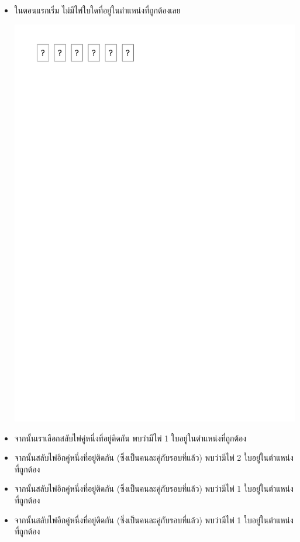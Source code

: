 \begin{itemize}[topsep=0pc,itemsep=0pc]
\item  ในตอนแรกเริ่ม ไม่มีไพ่ใบใดที่อยู่ในตำแหน่งที่ถูกต้องเลย
    \begin{center}
        \includegraphics[page=1]{figures/puzzle.pdf}
    \end{center}
\item  จากนั้นเราเลือกสลับไพ่คู่หนึ่งที่อยู่ติดกัน \; พบว่ามีไพ่ 1 ใบอยู่ในตำแหน่งที่ถูกต้อง
\item  จากนั้นสลับไพ่อีกคู่หนึ่งที่อยู่ติดกัน (ซึ่งเป็นคนละคู่กับรอบที่แล้ว) \; พบว่ามีไพ่ 2 ใบอยู่ในตำแหน่งที่ถูกต้อง
\item  จากนั้นสลับไพ่อีกคู่หนึ่งที่อยู่ติดกัน (ซึ่งเป็นคนละคู่กับรอบที่แล้ว) \; พบว่ามีไพ่ 1 ใบอยู่ในตำแหน่งที่ถูกต้อง
\item  จากนั้นสลับไพ่อีกคู่หนึ่งที่อยู่ติดกัน (ซึ่งเป็นคนละคู่กับรอบที่แล้ว) \; พบว่ามีไพ่ 1 ใบอยู่ในตำแหน่งที่ถูกต้อง

\end{itemize}

